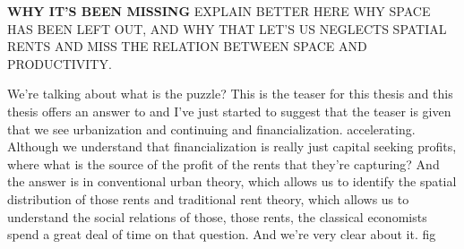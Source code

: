 \textbf{WHY IT'S BEEN MISSING}
EXPLAIN BETTER HERE WHY SPACE HAS BEEN LEFT OUT, AND WHY THAT LET'S US NEGLECTS SPATIAL RENTS AND MISS THE RELATION BETWEEN SPACE AND PRODUCTIVITY.

We're talking about what is the puzzle? This is the teaser for this thesis and this thesis offers an answer to and I've just started to suggest that the teaser is given that we see urbanization and continuing and financialization. accelerating. Although we understand that financialization is really just capital seeking profits, where what is the source of the profit of the rents that they're capturing? And the answer is in conventional urban theory, which allows us to identify the spatial distribution of those rents and traditional rent theory, which allows us to understand the social relations of those, those rents, the classical economists spend a great deal of time on that question. And we're very clear about it.
fig

